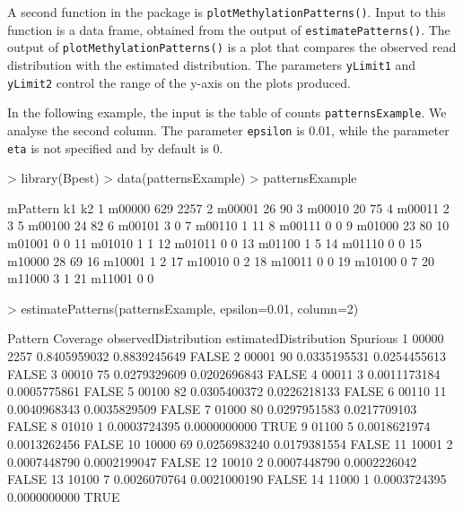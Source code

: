 \documentclass[12pt]{article}
\begin{document}
A second function in the package is {\tt plotMethylationPatterns()}. 
Input to this function is a data frame, obtained from the output of {\tt estimatePatterns()}. 
The output of {\tt plotMethylationPatterns()} is a plot that compares the observed read distribution with the estimated distribution.
The parameters {\tt yLimit1} and  {\tt yLimit2} control the range of the y-axis on the plots produced.

In the following example, the input is the table of counts {\tt patternsExample}.
We analyse the second column.
The parameter {\tt epsilon} is 0.01, while the parameter {\tt eta} is not specified and by default is 0. 

\begin{Schunk}
\begin{Sinput}
> library(Bpest)
> data(patternsExample)
> patternsExample
\end{Sinput}
\begin{Soutput}
   mPattern  k1   k2
1    m00000 629 2257
2    m00001  26   90
3    m00010  20   75
4    m00011   2    3
5    m00100  24   82
6    m00101   3    0
7    m00110   1   11
8    m00111   0    0
9    m01000  23   80
10   m01001   0    0
11   m01010   1    1
12   m01011   0    0
13   m01100   1    5
14   m01110   0    0
15   m10000  28   69
16   m10001   1    2
17   m10010   0    2
18   m10011   0    0
19   m10100   0    7
20   m11000   3    1
21   m11001   0    0
\end{Soutput}
\begin{Sinput}
> estimatePatterns(patternsExample, epsilon=0.01, column=2)
\end{Sinput}
\begin{Soutput}
   Pattern Coverage observedDistribution estimatedDistribution Spurious
1    00000     2257         0.8405959032          0.8839245649    FALSE
2    00001       90         0.0335195531          0.0254455613    FALSE
3    00010       75         0.0279329609          0.0202696843    FALSE
4    00011        3         0.0011173184          0.0005775861    FALSE
5    00100       82         0.0305400372          0.0226218133    FALSE
6    00110       11         0.0040968343          0.0035829509    FALSE
7    01000       80         0.0297951583          0.0217709103    FALSE
8    01010        1         0.0003724395          0.0000000000     TRUE
9    01100        5         0.0018621974          0.0013262456    FALSE
10   10000       69         0.0256983240          0.0179381554    FALSE
11   10001        2         0.0007448790          0.0002199047    FALSE
12   10010        2         0.0007448790          0.0002226042    FALSE
13   10100        7         0.0026070764          0.0021000190    FALSE
14   11000        1         0.0003724395          0.0000000000     TRUE
\end{Soutput}
\end{Schunk}
\end{document}
